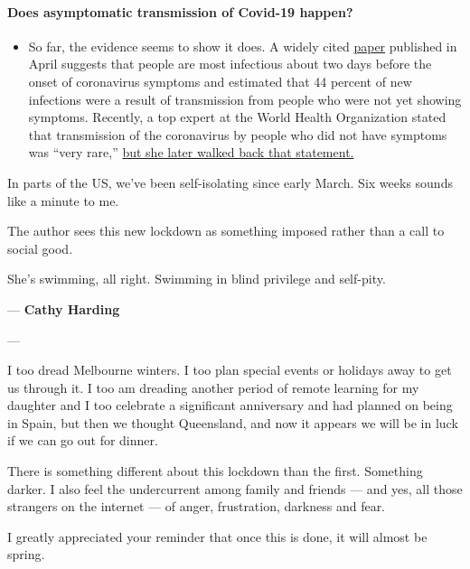 \begin{itemize}
{  \paragraph{Does asymptomatic transmission of Covid-19
  happen?}\label{does-asymptomatic-transmission-of-covid-19-happen}}

  \begin{itemize}
  \tightlist
  \item
    So far, the evidence seems to show it does. A widely cited
    \href{https://www.nature.com/articles/s41591-020-0869-5}{paper}
    published in April suggests that people are most infectious about
    two days before the onset of coronavirus symptoms and estimated that
    44 percent of new infections were a result of transmission from
    people who were not yet showing symptoms. Recently, a top expert at
    the World Health Organization stated that transmission of the
    coronavirus by people who did not have symptoms was ``very rare,''
    \href{https://www.nytimes3xbfgragh.onion/2020/06/09/world/coronavirus-updates.html?action=click\&pgtype=Article\&state=default\&region=MAIN_CONTENT_3\&context=storylines_faq\#link-1f302e21}{but
    she later walked back that statement.}
  \end{itemize}
\end{itemize}

In parts of the US, we've been self-isolating since early March. Six
weeks sounds like a minute to me.

The author sees this new lockdown as something imposed rather than a
call to social good.

She's swimming, all right. Swimming in blind privilege and self-pity.

--- \textbf{Cathy Harding}

---

I too dread Melbourne winters. I too plan special events or holidays
away to get us through it. I too am dreading another period of remote
learning for my daughter and I too celebrate a significant anniversary
and had planned on being in Spain, but then we thought Queensland, and
now it appears we will be in luck if we can go out for dinner.

There is something different about this lockdown than the first.
Something darker. I also feel the undercurrent among family and friends
--- and yes, all those strangers on the internet --- of anger,
frustration, darkness and fear.

I greatly appreciated your reminder that once this is done, it will
almost be spring.

